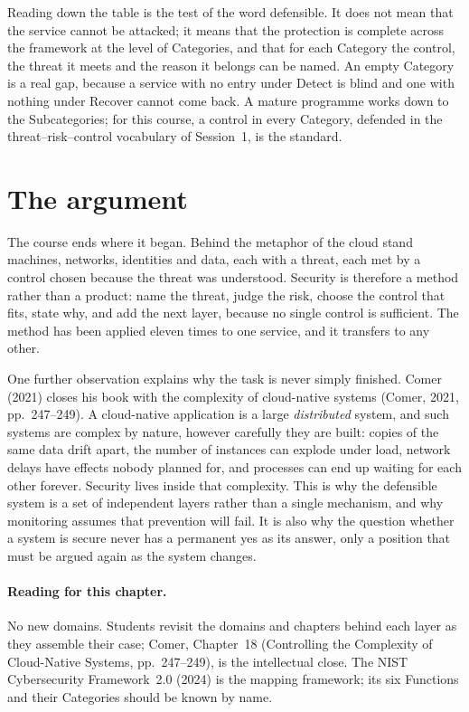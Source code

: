 Reading down the table is the test of the word defensible. It does not mean
that the service cannot be attacked; it means that the protection is
complete across the framework at the level of Categories, and that for each
Category the control, the threat it meets and the reason it belongs can be
named. An empty Category is a real gap, because a service with no entry
under Detect is blind and one with nothing under Recover cannot come back.
A mature programme works down to the Subcategories; for this course, a
control in every Category, defended in the threat--risk--control vocabulary
of Session~1, is the standard.

\section{The argument}

The course ends where it began. Behind the metaphor of the cloud stand
machines, networks, identities and data, each with a threat, each met by a
control chosen because the threat was understood. Security is therefore a
method rather than a product: name the threat, judge the risk, choose the
control that fits, state why, and add the next layer, because no single
control is sufficient. The method has been applied eleven times to one
service, and it transfers to any other.

One further observation explains why the task is never simply finished.
Comer (2021) closes his book with the complexity of cloud-native systems
(Comer, 2021, pp.~247--249). A cloud-native application is a large
\emph{distributed} system, and such systems are complex by nature, however
carefully they are built: copies of the same data drift apart, the number
of instances can explode under load, network delays have effects nobody
planned for, and processes can end up waiting for each other forever.
Security lives inside that complexity. This is why the defensible system is
a set of independent layers rather than a single mechanism, and why
monitoring assumes that prevention will fail. It is also why the question
whether a system is secure never has a permanent yes as its answer, only a
position that must be argued again as the system changes.

\paragraph{Reading for this chapter.} No new domains. Students revisit the
domains and chapters behind each layer as they assemble their case; Comer,
Chapter~18 (Controlling the Complexity of Cloud-Native Systems, pp.~247--249),
is the intellectual close. The NIST Cybersecurity Framework~2.0 (2024) is the
mapping framework; its six Functions and their Categories should be known by
name.

